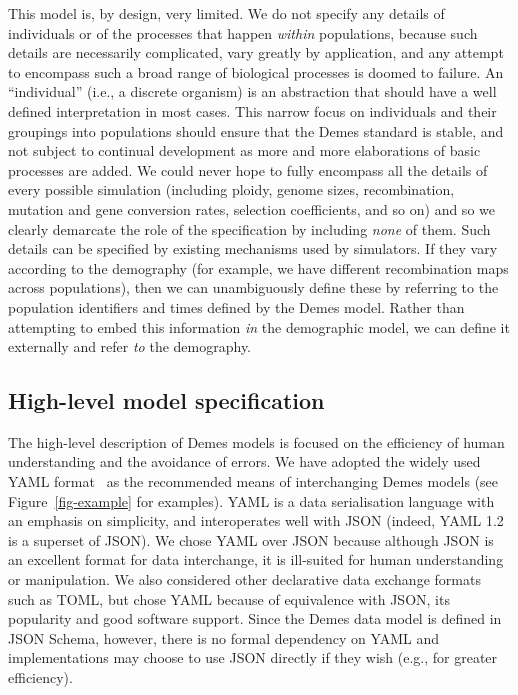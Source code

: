 \documentclass[11pt]{article}
\begin{document}
This model is, by design, very limited. We do not specify any details of
individuals or of the processes that happen \emph{within} populations,
because such details are necessarily complicated, vary greatly by
application, and any attempt to encompass such a broad range of biological
processes is doomed to failure. An ``individual'' (i.e., a discrete
organism) is an abstraction that should have a well defined interpretation
in most cases.
This narrow focus on individuals and their groupings into populations
should ensure that the Demes standard is stable, and not subject to
continual development as more and more elaborations of basic processes
are added. We could never hope to fully encompass all the details
of every possible simulation (including ploidy,
genome sizes, recombination, mutation and gene conversion rates,
selection coefficients, and so on) and so we clearly demarcate the
role of the specification by including \emph{none} of them.
Such details can be specified by existing mechanisms used by
simulators. If they vary according to the demography (for example,
we have different recombination maps across populations), then
we can unambiguously define these by referring to the population
identifiers and times defined by the Demes model. Rather than attempting
to embed this information \emph{in} the demographic model, we
can define it externally and refer \emph{to} the demography.

\subsection*{High-level model specification}

The high-level description of Demes models is focused on the efficiency of
human understanding and the avoidance of errors. We have adopted the widely
used YAML format~\citep{ben2009yaml} as the recommended means of interchanging
Demes models (see Figure~\ref{fig-example} for examples). YAML is a data
serialisation language with an emphasis on simplicity, and interoperates well
with JSON (indeed, YAML 1.2 is a superset of JSON). We chose YAML over JSON
because although JSON is an excellent format for data interchange, it is
ill-suited for human understanding or manipulation. We also considered other
declarative data exchange formats such as TOML,
but chose YAML because of equivalence with JSON,
its popularity and good software support.
Since the Demes data model is defined in JSON Schema,
however, there is no formal dependency on YAML and implementations may choose
to use JSON directly if they wish (e.g., for greater efficiency).
\end{document}
